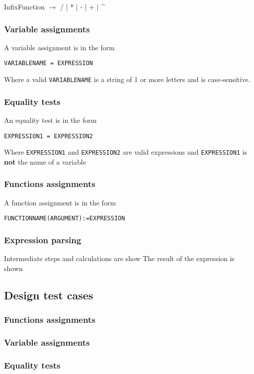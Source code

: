 \documentclass[11pt,a4paper]{article}
\begin{document}
InfixFunction \(\rightarrow\) / | * | - | + | \^{}


\subsubsection{Variable assignments}
\label{sec:orgheadline4}
A variable assignment is in the form

\texttt{VARIABLENAME = EXPRESSION}

Where a valid \texttt{VARIABLENAME} is a string of 1 or more letters and
is case-sensitive.
\subsubsection{Equality tests}
\label{sec:orgheadline5}
An equality test is in the form

\texttt{EXPRESSION1 = EXPRESSION2}

Where \texttt{EXPRESSION1} and \texttt{EXPRESSION2} are valid expressions and
\texttt{EXPRESSION1} is \textbf{not} the name of a variable

\subsubsection{Functions assignments}
\label{sec:orgheadline6}
A function assignment is in the form

\texttt{FUNCTIONNAME(ARGUMENT):=EXPRESSION}
\subsubsection{Expression parsing}
\label{sec:orgheadline7}
Intermediate steps and calculations are show
The result of the expression is shown
\subsection{Design test cases}
\label{sec:orgheadline13}
\subsubsection{Functions assignments}
\label{sec:orgheadline9}
\subsubsection{Variable assignments}
\label{sec:orgheadline10}
\subsubsection{Equality tests}
\label{sec:orgheadline11}
\end{document}
